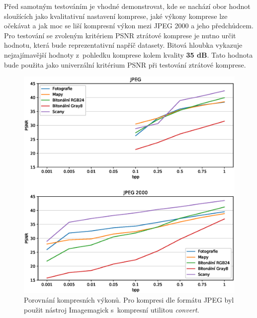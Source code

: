 %
%
Před samotným testováním je vhodné demonstrovat, kde se nachází obor hodnot sloužících jako kvalitativní nastavení komprese, jaké výkony komprese lze očekávat a jak moc se liší kompresní výkon mezi JPEG 2000 a jeho předchůdcem. Pro testování se zvoleným kritériem PSNR ztrátové komprese je nutno určit hodnotu, která bude reprezentativní napříč datasety. Bitová hloubka vykazuje nejzajímavější hodnoty z~pohledku komprese kolem kvality \textbf{35 dB}. Tato hodnota bude použita jako univerzální kritérium PSNR při testování ztrátové komprese.
\begin{figure}[hbt!]
  \centering
  \hspace*{-0.5cm}
  \includegraphics[width=16cm]{obrazky-figures/porovnani.eps}
  \caption{Porovnání kompresních výkonů. Pro kompresi dle formátu JPEG byl použit nástroj Imagemagick s~kompresní utilitou \textit{convert}.}
\end{figure}
\clearpage

